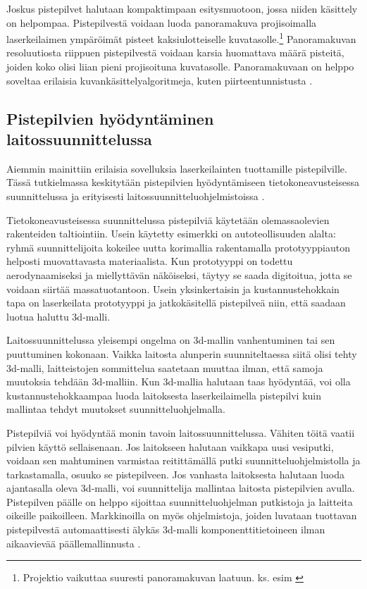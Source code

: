 Joskus pistepilvet halutaan kompaktimpaan esitysmuotoon, jossa niiden käsittely on helpompaa. Pistepilvestä voidaan luoda panoramakuva projisoimalla laserkeilaimen ympäröimät pisteet kaksiulotteiselle kuvatasolle.\footnote{Projektio vaikuttaa suuresti panoramakuvan laatuun. ks. esim \cite{proj}} Panoramakuvan resoluutiosta riippuen pistepilvestä voidaan karsia huomattava määrä pisteitä, joiden koko olisi liian pieni projisoituna kuvatasolle. Panoramakuvaan on helppo soveltaa erilaisia kuvankäsittelyalgoritmeja, kuten piirteentunnistusta . 

\subsection{Pistepilvien hyödyntäminen laitossuunnittelussa}

Aiemmin mainittiin erilaisia sovelluksia laserkeilainten tuottamille pistepilville. Tässä tutkielmassa keskitytään pistepilvien hyödyntämiseen tietokoneavusteisessa suunnittelussa  ja erityisesti laitossuunnitteluohjelmistoissa .

Tietokoneavusteisessa suunnittelussa pistepilviä käytetään olemassaolevien rakenteiden taltiointiin. Usein käytetty esimerkki on autoteollisuuden alalta: ryhmä suunnittelijoita kokeilee uutta korimallia rakentamalla prototyyppiauton helposti muovattavasta materiaalista. Kun prototyyppi on todettu aerodynaamiseksi ja miellyttävän näköiseksi, täytyy se saada digitoitua, jotta se voidaan siirtää massatuotantoon. Usein yksinkertaisin ja kustannustehokkain tapa on laserkeilata prototyyppi ja jatkokäsitellä pistepilveä niin, että saadaan luotua haluttu 3d-malli.

Laitossuunnittelussa yleisempi ongelma on 3d-mallin vanhentuminen tai sen puuttuminen kokonaan. Vaikka laitosta alunperin suunniteltaessa siitä olisi tehty 3d-malli, laitteistojen sommittelua saatetaan muuttaa ilman, että samoja muutoksia tehdään 3d-malliin. Kun 3d-mallia halutaan taas hyödyntää, voi olla kustannustehokkaampaa luoda laitoksesta laserkeilaimella pistepilvi kuin mallintaa tehdyt muutokset suunnitteluohjelmalla. \cite{Piipponen}

Pistepilviä voi hyödyntää monin tavoin laitossuunnittelussa. Vähiten töitä vaatii pilvien käyttö sellaisenaan. Jos laitokseen halutaan vaikkapa uusi vesiputki, voidaan sen mahtuminen varmistaa reitittämällä putki suunnitteluohjelmistolla ja tarkastamalla, osuuko se pistepilveen. Jos vanhasta laitoksesta halutaan luoda ajantasalla oleva 3d-malli, voi suunnittelija mallintaa laitosta pistepilvien avulla. Pistepilven päälle on helppo sijoittaa suunnitteluohjelman putkistoja ja laitteita oikeille paikoilleen. Markkinoilla on myös ohjelmistoja, joiden luvataan tuottavan pistepilvestä automaattisesti älykäs 3d-malli komponenttitietoineen ilman aikaavievää päällemallinnusta \cite{aveva}.

